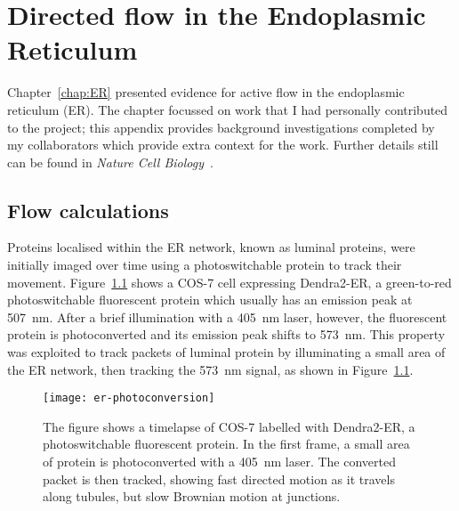 
\ifpdf
    \graphicspath{{Appendix2/Figs/Raster/}{Appendix2/Figs/PDF/}{Appendix2/Figs/}}
\else
    \graphicspath{{Appendix2/Figs/Vector/}{Appendix2/Figs/}}
\fi

\chapter{Directed flow in the Endoplasmic Reticulum} \label{appx:er}
Chapter~\ref{chap:ER} presented evidence for active flow in the endoplasmic reticulum (ER). 
The chapter focussed on work that I had personally contributed to the project; this appendix provides background investigations completed by my collaborators which provide extra context for the work. 
Further details still can be found in \textit{Nature Cell Biology}~\cite{holcman2018single}. 

\section{Flow calculations} \label{appn:flow}
Proteins localised within the ER network, known as luminal proteins, were initially imaged over time using a photoswitchable protein to track their movement. 
Figure~\ref{fig:er-photoconversion} shows a COS-7 cell expressing Dendra2-ER, a green-to-red photoswitchable fluorescent protein which usually has an emission peak at \SI{507}{\nano\metre}. 
After a brief illumination with a \SI{405}{\nano\metre} laser, however, the fluorescent protein is photoconverted and its emission peak shifts to \SI{573}{\nano\metre}. 
This property was exploited to track packets of luminal protein by illuminating a small area of the ER network, then tracking the \SI{573}{\nano\metre} signal, as shown in Figure~\ref{fig:er-photoconversion}. 

\begin{figure}[tbp]
\centering
\texttt{[image: er-photoconversion]}
\caption[Photoconversion allows luminal ER proteins to be tracked]{The figure shows a timelapse of COS-7 labelled with Dendra2-ER, a photoswitchable fluorescent protein. In the first frame, a small area of protein is photoconverted with a \SI{405}{\nano\metre} laser. The converted packet is then tracked, showing fast directed motion as it travels along tubules, but slow Brownian motion at junctions. } 
\label{fig:er-photoconversion}
\end{figure}

